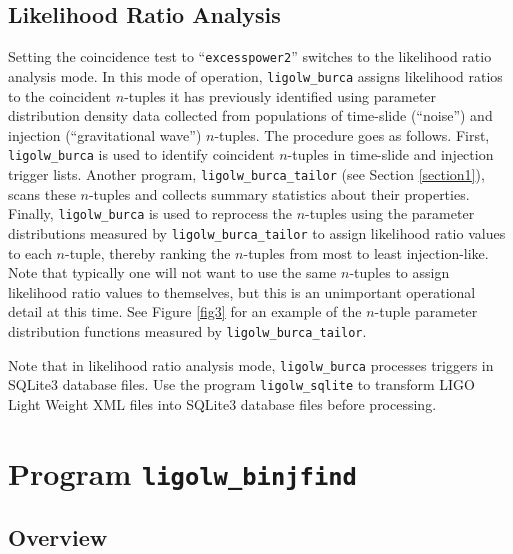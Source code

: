 \documentclass[10pt]{article}
\newcommand{\prog}[1]{\texttt{#1}}
\newcommand{\option}[1]{\texttt{#1}}
\begin{document}
\subsection{Likelihood Ratio Analysis}


Setting the coincidence test to ``\option{excesspower2}'' switches to the
likelihood ratio analysis mode.  In this mode of operation,
\prog{ligolw\_burca} assigns likelihood ratios to the coincident
\(n\)-tuples it has previously identified using parameter distribution
density data collected from populations of time-slide (``noise'') and
injection (``gravitational wave'') \(n\)-tuples.  The procedure goes as
follows.  First, \prog{ligolw\_burca} is used to identify coincident
\(n\)-tuples in time-slide and injection trigger lists.  Another program,
\prog{ligolw\_burca\_tailor} (see Section \ref{section1}), scans these
\(n\)-tuples and collects summary statistics about their properties.
Finally, \prog{ligolw\_burca} is used to reprocess the \(n\)-tuples using
the parameter distributions measured by \prog{ligolw\_burca\_tailor} to
assign likelihood ratio values to each \(n\)-tuple, thereby ranking the
\(n\)-tuples from most to least injection-like.  Note that typically one
will not want to use the same \(n\)-tuples to assign likelihood ratio
values to themselves, but this is an unimportant operational detail at this
time.  See Figure \ref{fig3} for an example of the \(n\)-tuple parameter
distribution functions measured by \prog{ligolw\_burca\_tailor}.

Note that in likelihood ratio analysis mode, \prog{ligolw\_burca} processes
triggers in SQLite3 database files.  Use the program \prog{ligolw\_sqlite}
to transform LIGO Light Weight XML files into SQLite3 database files before
processing.


\section{Program \prog{ligolw\_binjfind}}


\subsection{Overview}
\end{document}
